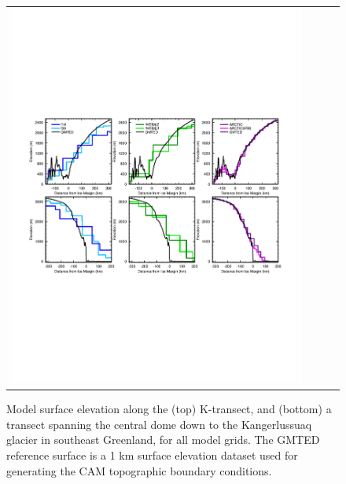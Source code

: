 \documentclass[draft]{agujournal2019}
\begin{document}
\begin{figure}[t]
\begin{center}
\begin{tabular}{cccc}
         \includegraphics[width=130mm]{temp_zsects.pdf}
\end{tabular}
\end{center}
\caption{Model surface elevation along the (top) K-transect, and (bottom) a transect spanning the central dome down to the Kangerlussuaq glacier in southeast Greenland, for all model grids. The GMTED reference surface is a 1 km surface elevation dataset \cite{GMTED2010} used for generating the CAM topographic boundary conditions. }
\label{fig:ztrans}
\end{figure}
\end{document}
